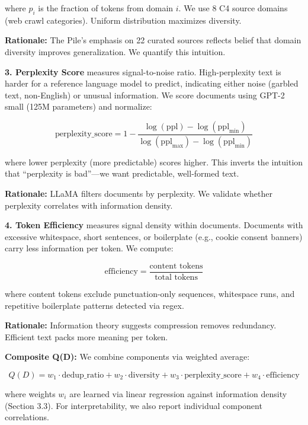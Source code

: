 where $p_i$ is the fraction of tokens from domain $i$. We use 8 C4 source domains (web crawl categories). Uniform distribution maximizes diversity.

\textbf{Rationale:} The Pile's emphasis on 22 curated sources reflects belief that domain diversity improves generalization. We quantify this intuition.

\textbf{3. Perplexity Score} measures signal-to-noise ratio. High-perplexity text is harder for a reference language model to predict, indicating either noise (garbled text, non-English) or unusual information. We score documents using GPT-2 small (125M parameters) and normalize:

\begin{equation}
\text{perplexity\_score} = 1 - \frac{\log(\text{ppl}) - \log(\text{ppl}_{\min})}{\log(\text{ppl}_{\max}) - \log(\text{ppl}_{\min})}
\end{equation}

where lower perplexity (more predictable) scores higher. This inverts the intuition that ``perplexity is bad''---we want predictable, well-formed text.

\textbf{Rationale:} LLaMA filters documents by perplexity. We validate whether perplexity correlates with information density.

\textbf{4. Token Efficiency} measures signal density within documents. Documents with excessive whitespace, short sentences, or boilerplate (e.g., cookie consent banners) carry less information per token. We compute:

\begin{equation}
\text{efficiency} = \frac{\text{content tokens}}{\text{total tokens}}
\end{equation}

where content tokens exclude punctuation-only sequences, whitespace runs, and repetitive boilerplate patterns detected via regex.

\textbf{Rationale:} Information theory suggests compression removes redundancy. Efficient text packs more meaning per token.

\textbf{Composite Q(D):} We combine components via weighted average:

\begin{equation}
Q(D) = w_1 \cdot \text{dedup\_ratio} + w_2 \cdot \text{diversity} + w_3 \cdot \text{perplexity\_score} + w_4 \cdot \text{efficiency}
\end{equation}

where weights $w_i$ are learned via linear regression against information density (Section 3.3). For interpretability, we also report individual component correlations.

